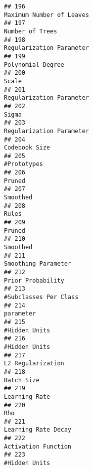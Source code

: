 \documentclass[
]{article}
\begin{document}
\begin{verbatim}
## 196                                                                Maximum Number of Leaves
## 197                                                                         Number of Trees
## 198                                                                Regularization Parameter
## 199                                                                       Polynomial Degree
## 200                                                                                   Scale
## 201                                                                Regularization Parameter
## 202                                                                                   Sigma
## 203                                                                Regularization Parameter
## 204                                                                           Codebook Size
## 205                                                                             #Prototypes
## 206                                                                                  Pruned
## 207                                                                                Smoothed
## 208                                                                                   Rules
## 209                                                                                  Pruned
## 210                                                                                Smoothed
## 211                                                                     Smoothing Parameter
## 212                                                                       Prior Probability
## 213                                                                   #Subclasses Per Class
## 214                                                                               parameter
## 215                                                                           #Hidden Units
## 216                                                                           #Hidden Units
## 217                                                                       L2 Regularization
## 218                                                                              Batch Size
## 219                                                                           Learning Rate
## 220                                                                                     Rho
## 221                                                                     Learning Rate Decay
## 222                                                                     Activation Function
## 223                                                                           #Hidden Units

\end{verbatim}
\end{document}
